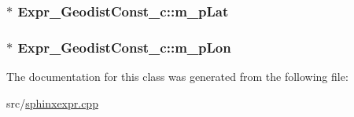 \hypertarget{classExpr__GeodistConst__c_a299fd0f469597f30c3b358a8410bd7d8}{
\subsubsection[{m\-\_\-p\-Lat}]{$\ast$ Expr\-\_\-\-Geodist\-Const\-\_\-c\-::m\-\_\-p\-Lat\hspace{0.3cm}{\ttfamily [private]}}}\label{classExpr__GeodistConst__c_a299fd0f469597f30c3b358a8410bd7d8}
\hypertarget{classExpr__GeodistConst__c_aa6d0faa1b2dccf6e7fedfbd4beac12e8}{
\subsubsection[{m\-\_\-p\-Lon}]{$\ast$ Expr\-\_\-\-Geodist\-Const\-\_\-c\-::m\-\_\-p\-Lon\hspace{0.3cm}{\ttfamily [private]}}}\label{classExpr__GeodistConst__c_aa6d0faa1b2dccf6e7fedfbd4beac12e8}


The documentation for this class was generated from the following file\-:\begin{DoxyCompactItemize}
\item 
src/\hyperlink{sphinxexpr_8cpp}{sphinxexpr.\-cpp}\end{DoxyCompactItemize}
